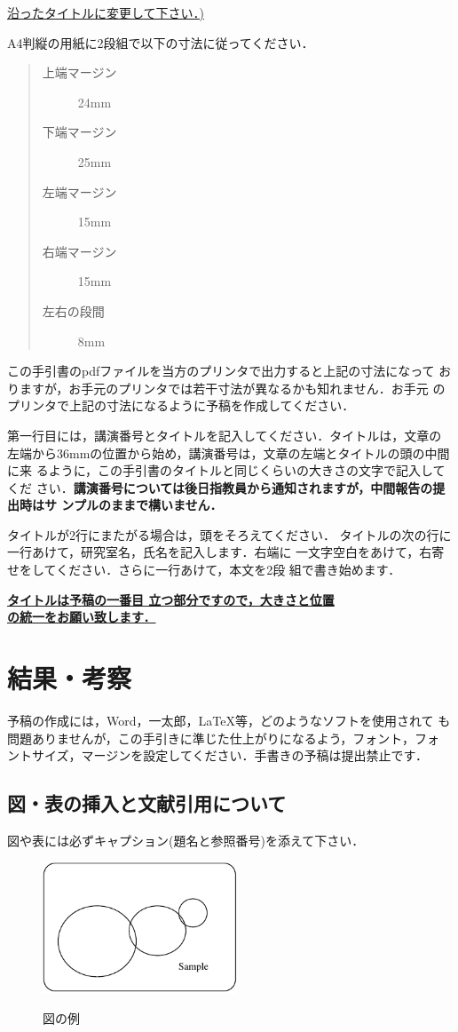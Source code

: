 \documentclass[10pt,twocolumn, a4j]{jsarticle}
\begin{document}
\underline{沿ったタイトルに変更して下さい．)}

A4判縦の用紙に2段組で以下の寸法に従ってください．
\begin{quote}
\begin{description}
\item[上端マージン] 24mm
\item[下端マージン] 25mm
\item[左端マージン] 15mm
\item[右端マージン] 15mm
\item[左右の段間] 8mm
\end{description}
\end{quote}

この手引書のpdfファイルを当方のプリンタで出力すると上記の寸法になって
おりますが，お手元のプリンタでは若干寸法が異なるかも知れません．お手元
のプリンタで上記の寸法になるように予稿を作成してください．


第一行目には，講演番号とタイトルを記入してください．タイトルは，文章の
左端から36mmの位置から始め，講演番号は，文章の左端とタイトルの頭の中間に来
るように，この手引書のタイトルと同じくらいの大きさの文字で記入してくだ
さい．{\bf 講演番号については後日指教員から通知されますが，中間報告の提出時はサ
ンプルのままで構いません．}

タイトルが2行にまたがる場合は，頭をそろえてください．
タイトルの次の行に一行あけて，研究室名，氏名を記入します．右端に
一文字空白をあけて，右寄せをしてください．さらに一行あけて，本文を2段
組で書き始めます．

{\bf \underline{タイトルは予稿の一番目
立つ部分ですので，大きさと位置}}\\
{\bf \underline{の統一をお願い致します．}}

\section{結果・考察}
予稿の作成には，Word，一太郎，\LaTeX 等，どのようなソフトを使用されて
も問題ありませんが，この手引きに準じた仕上がりになるよう，フォント，フォ
ントサイズ，マージンを設定してください．手書きの予稿は提出禁止です．

\subsection{図・表の挿入と文献引用について}
図や表には必ずキャプション{\scriptsize (題名と参照番号)}を添えて下さい．

\begin{figure}[htbp]
  \begin{center}
     \includegraphics[width=5.8cm,keepaspectratio]{figure.pdf}\\
  \end{center}
  \caption{図の例}%
\label{fig1}
\end{figure}
\end{document}
